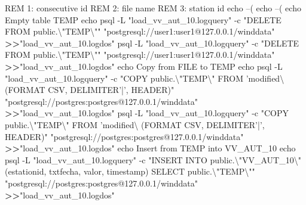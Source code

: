 \documentclass[12pt,oneside]{reedthesis}
\newenvironment{Shaded}{\begin{snugshade}}{\end{snugshade}}
\newcommand{\BuiltInTok}[1]{#1}
\newcommand{\DataTypeTok}[1]{\textcolor[rgb]{0.13,0.29,0.53}{#1}}
\newcommand{\ExtensionTok}[1]{#1}
\newcommand{\NormalTok}[1]{#1}
\newcommand{\OperatorTok}[1]{\textcolor[rgb]{0.81,0.36,0.00}{\textbf{#1}}}
\newcommand{\StringTok}[1]{\textcolor[rgb]{0.31,0.60,0.02}{#1}}
\begin{document}
\vspace{0.4cm}
\begin{Shaded}
\begin{Highlighting}[]
      \ExtensionTok{REM}\NormalTok{ 1: consecutive id}
      \ExtensionTok{REM}\NormalTok{ 2: file name}
      \ExtensionTok{REM}\NormalTok{ 3: station id}
      \BuiltInTok{echo}\NormalTok{ --(%
      \BuiltInTok{echo}\NormalTok{ --(%
      \BuiltInTok{echo}\NormalTok{ Empty table TEMP}
      \BuiltInTok{echo}\NormalTok{ psql -L }\StringTok{"load_vv_aut_10.logquery"}\NormalTok{ -c }\StringTok{"DELETE FROM public.}\DataTypeTok{\textbackslash{}"}\StringTok{TEMP}\DataTypeTok{\textbackslash{}"}\StringTok{"} 
       \StringTok{"postgresql://user1:user1@127.0.0.1/winddata"} \OperatorTok{>>}\StringTok{"load_vv_aut_10.logdos"}
      \ExtensionTok{psql}\NormalTok{ -L }\StringTok{"load_vv_aut_10.logquery"}\NormalTok{ -c }\StringTok{"DELETE FROM public.}\DataTypeTok{\textbackslash{}"}\StringTok{TEMP}\DataTypeTok{\textbackslash{}"}\StringTok{"} 
       \StringTok{"postgresql://user1:user1@127.0.0.1/winddata"} \OperatorTok{>>}\StringTok{"load_vv_aut_10.logdos"}
      \BuiltInTok{echo}\NormalTok{ Copy from FILE to TEMP}
      \BuiltInTok{echo}\NormalTok{ psql -L }\StringTok{"load_vv_aut_10.logquery"}\NormalTok{ -c }\StringTok{"COPY public.}\DataTypeTok{\textbackslash{}"}\StringTok{TEMP}\DataTypeTok{\textbackslash{}"}\StringTok{ FROM 'modified\textbackslash{}%
\StringTok{       (FORMAT CSV, DELIMITER'|', HEADER)"} \StringTok{"postgresql://postgres:postgres@127.0.0.1/winddata"}
       \OperatorTok{>>}\StringTok{"load_vv_aut_10.logdos"}
      \ExtensionTok{psql}\NormalTok{ -L }\StringTok{"load_vv_aut_10.logquery"}\NormalTok{ -c }\StringTok{"COPY public.}\DataTypeTok{\textbackslash{}"}\StringTok{TEMP}\DataTypeTok{\textbackslash{}"}\StringTok{ FROM 'modified\textbackslash{}%
\StringTok{       (FORMAT CSV, DELIMITER'|', HEADER)"} \StringTok{"postgresql://postgres:postgres@127.0.0.1/winddata"} 
       \OperatorTok{>>}\StringTok{"load_vv_aut_10.logdos"}
      \BuiltInTok{echo}\NormalTok{ Insert from TEMP into VV_AUT_10}
      \BuiltInTok{echo}\NormalTok{ psql -L }\StringTok{"load_vv_aut_10.logquery"}\NormalTok{ -c }\StringTok{"INSERT INTO public.}\DataTypeTok{\textbackslash{}"}\StringTok{VV_AUT_10}\DataTypeTok{\textbackslash{}"}\StringTok{(estationid, txtfecha, valor, }
\StringTok{       timestamp) SELECT %
\StringTok{       public.}\DataTypeTok{\textbackslash{}"}\StringTok{TEMP}\DataTypeTok{\textbackslash{}"}\StringTok{"} \StringTok{"postgresql://postgres:postgres@127.0.0.1/winddata"} \OperatorTok{>>}\StringTok{"load_vv_aut_10.logdos"}
}}}}}
\end{Highlighting}
\end{Shaded}
\end{document}
